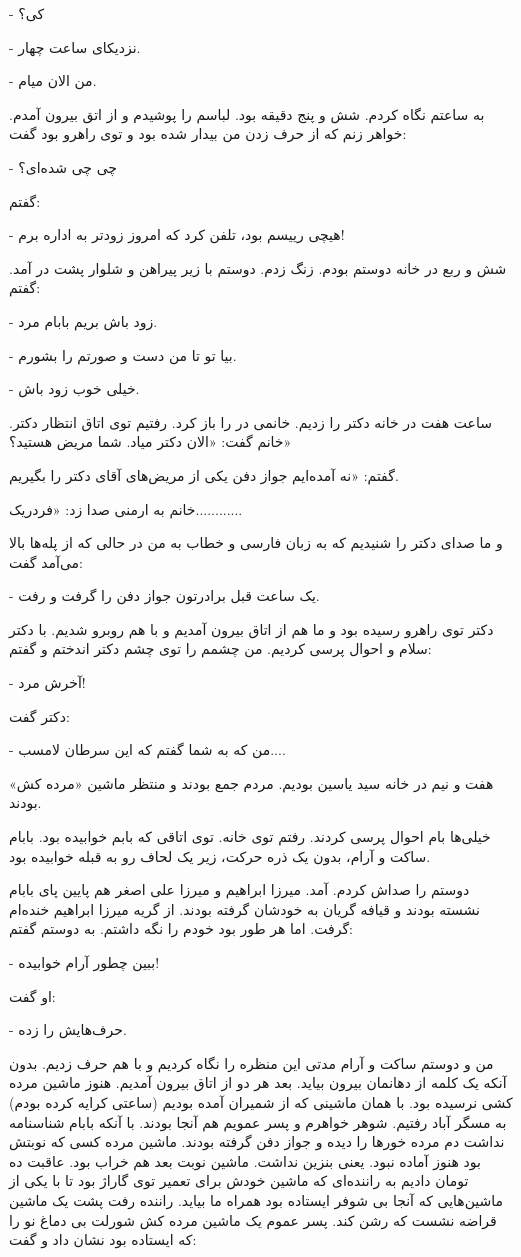 \documentclass[12pt,a4paper]{book}
\begin{document}
- کی؟

- نزدیکای ساعت چهار.

- من الان میام.

به ساعتم نگاه کردم. شش و پنج دقیقه بود. لباسم را پوشیدم و از اتق بیرون آمدم. خواهر زنم که از حرف زدن من بیدار شده بود و توی راهرو بود گفت:

- چی چی شده‌ای؟

گفتم:

- هیچی رییسم بود، تلفن کرد که امروز زودتر به اداره برم!

شش و ربع در خانه دوستم بودم. زنگ زدم. دوستم با زیر پیراهن و شلوار پشت در آمد. گفتم:

- زود باش بریم بابام مرد.

- بیا تو تا من دست و صورتم را بشورم.

- خیلی خوب زود باش.

ساعت هفت در خانه دکتر را زدیم. خانمی در را باز کرد. رفتیم توی اتاق انتظار دکتر. خانم گفت: «الان دکتر میاد. شما مریض هستید؟»

گفتم: «نه آمده‌ایم جواز دفن یکی از مریض‌های آقای دکتر را بگیریم.

خانم به ارمنی صدا زد: «فردریک............

و ما صدای دکتر را شنیدیم که به زبان فارسی و خطاب به من در حالی که از پله‌ها بالا می‌آمد گفت:

- یک ساعت قبل برادرتون جواز دفن را گرفت و رفت.

دکتر توی راهرو رسیده بود و ما هم از اتاق بیرون آمدیم و با هم روبرو شدیم. با دکتر سلام و احوال پرسی کردیم. من چشمم را توی چشم دکتر اندختم و گفتم:

- آخرش مرد!

دکتر گفت:

- من که به شما گفتم که این سرطان لامسب....

هفت و نیم در خانه سید یاسین بودیم. مردم جمع بودند و منتظر ماشین «مرده کش» بودند.

خیلی‌ها بام احوال پرسی کردند. رفتم توی خانه. توی اتاقی که بابم خوابیده بود. بابام ساکت و آرام، بدون یک ذره حرکت، زیر یک لحاف رو به قبله خوابیده بود.

دوستم را صداش کردم. آمد. میرزا ابراهیم و میرزا علی اصغر هم پایین پای بابام نشسته بودند و قیافه گریان به خودشان گرفته بودند. از گریه میرزا ابراهیم خنده‌ام گرفت. اما هر طور بود خودم را نگه داشتم. به دوستم گفتم:

- ببین چطور آرام خوابیده!

او گفت:

- حرف‌هایش را زده.

من و دوستم ساکت و آرام مدتی این منظره را نگاه کردیم و با هم حرف زدیم. بدون آنکه یک کلمه از دهانمان بیرون بیاید. بعد هر دو از اتاق بیرون آمدیم. هنوز ماشین مرده کشی نرسیده بود. با همان ماشینی که از شمیران آمده بودیم (ساعتی کرایه کرده بودم) به مسگر آباد رفتیم. شوهر خواهرم و پسر عمویم هم آنجا بودند. با آنکه بابام شناسنامه نداشت دم مرده خورها را دیده و جواز دفن گرفته بودند. ماشین مرده کسی که نوبتش بود هنوز آماده نبود. یعنی بنزین نداشت. ماشین نوبت بعد هم خراب بود. عاقبت ده تومان دادیم به راننده‌ای که ماشین خودش برای تعمیر توی گاراژ بود تا با یکی از ماشین‌هایی که آنجا بی شوفر ایستاده بود همراه ما بیاید. راننده رفت پشت یک ماشین قراضه نشست که رشن کند. پسر عموم یک ماشین مرده کش شورلت بی دماغ نو را که ایستاده بود نشان داد و گفت:
\end{document}
